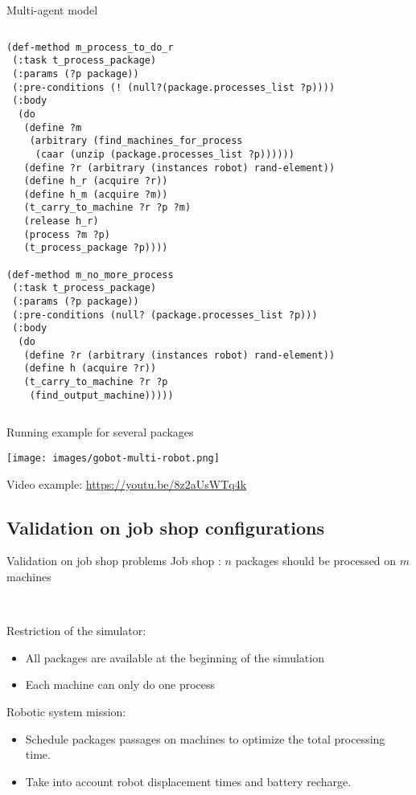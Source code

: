 \begin{frame}[fragile]{Multi-agent model}
\begin{columns}[t]
\begin{column}{0.5\textwidth}
\begin{lstlisting}
(def-method m_process_to_do_r
 (:task t_process_package)
 (:params (?p package))
 (:pre-conditions (! (null?(package.processes_list ?p))))
 (:body
  (do
   (define ?m
    (arbitrary (find_machines_for_process
     (caar (unzip (package.processes_list ?p))))))
   (define ?r (arbitrary (instances robot) rand-element))
   (define h_r (acquire ?r))
   (define h_m (acquire ?m))
   (t_carry_to_machine ?r ?p ?m)
   (release h_r)
   (process ?m ?p)
   (t_process_package ?p))))                  

(def-method m_no_more_process
 (:task t_process_package)
 (:params (?p package))
 (:pre-conditions (null? (package.processes_list ?p)))
 (:body
  (do
   (define ?r (arbitrary (instances robot) rand-element))
   (define h (acquire ?r))
   (t_carry_to_machine ?r ?p
    (find_output_machine)))))            
        \end{lstlisting}
    \end{column}
\end{columns}
 
\end{frame}

\begin{frame}{Running example for several packages}
    \centering

    \texttt{[image: images/gobot-multi-robot.png]}
    \Large

    Video example: \href{https://youtu.be/8z2aUsWTq4k}{https://youtu.be/8z2aUsWTq4k}
\end{frame}

\subsection{Validation on job shop configurations}
\begin{frame}[fragile]{Validation on job shop problems}
Job shop : $n$ packages should be processed on $m$ machines

~~

\pause
Restriction of the simulator:
\begin{itemize}
    \item All packages are available at the beginning of the simulation
    \item Each machine can only do one process
\end{itemize}

\pause
Robotic system mission:
\begin{itemize}
    \pause
    \item Schedule packages passages on machines to optimize the total processing time.
    \item Take into account robot displacement times and battery recharge.
\end{itemize}
\end{frame}


